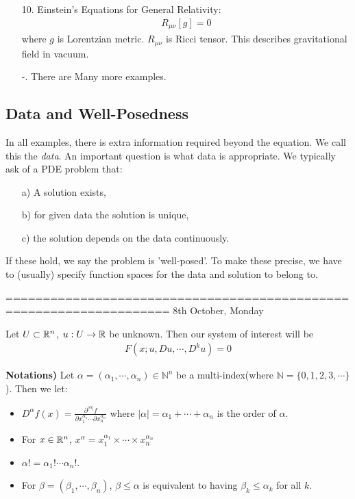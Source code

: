 \documentclass[12pt,a4paper]{report}
\begin{document}
\begin{itemize}
\item[10.] Einstein's Equations for General Relativity:
\begin{align*}
R_{\mu \nu}[g] =0
\end{align*}
where $g$ is Lorentzian metric. $R_{\mu \nu}$ is Ricci tensor. This describes gravitational field in vacuum.

\item[-.] There are Many more examples.
\end{itemize}

\subsection*{Data and Well-Posedness}
In all examples, there is extra information required beyond the equation. We call this the \emph{data}. An important question is what data is appropriate. We typically ask of a PDE problem that:
\begin{itemize}
\item[a)] A solution exists,
\item[b)] for given data the solution is unique,
\item[c)] the solution depends on the data continuously.
\end{itemize}
If these hold, we say the problem is 'well-posed'. To make these precise, we have to (usually) specify function spaces for the data and solution to belong to.
\s

====================================================================
8th October, Monday
\s

Let $U \subset \mathbb{R}^n$, $u: U \rightarrow \mathbb{R}$ be unknown. Then our system of interest will be
\begin{align}
F(x; u,Du,\cdots, D^k u)=0 \label{thePDE}
\end{align}
\s

\textbf{Notations) } Let $\alpha = (\alpha_1, \cdots, \alpha_n) \in \mathbb{N}^n$ be a multi-index(where $\mathbb{N} =\{ 0,1,2,3,\cdots\}$). Then we let:
\begin{itemize}
\item $D^{\alpha}f(x) = \frac{\partial^{| \alpha |} f}{\partial x_1^{\alpha_1} \cdots \partial x_n^{\alpha_n}}$ where $|\alpha| = \alpha_1 + \cdots + \alpha_n$ is the order of $\alpha$.
\item For $x \in \mathbb{R}^n$, $x^{\alpha} = x_1^{\alpha_1} \times \cdots \times x_n^{\alpha_n}$
\item $\alpha! = \alpha_1! \cdots \alpha_n!$.
\item For $\beta = (\beta_1, \cdots, \beta_n)$, $\beta \leq \alpha$ is equivalent to having $\beta_k \leq \alpha_k$ for all $k$.
\end{itemize}
\s
\end{document}
